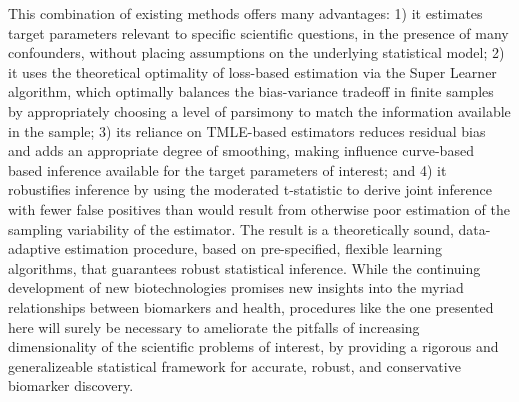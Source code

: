This combination of existing methods offers many advantages: 1) it estimates
target parameters relevant to specific scientific questions, in the presence of
many confounders, without placing assumptions on the underlying statistical
model; 2) it uses the theoretical optimality of loss-based estimation via the
Super Learner algorithm, which optimally balances the bias-variance tradeoff in
finite samples by appropriately choosing a level of parsimony to match the
information available in the sample; 3) its reliance on TMLE-based estimators
reduces residual bias and adds an appropriate degree of smoothing, making
influence curve-based based inference available for the target parameters of
interest; and 4) it robustifies inference by using the moderated t-statistic to
derive joint inference with fewer false positives than would result from
otherwise poor estimation of the sampling variability of the estimator. The
result is a theoretically sound, data-adaptive estimation procedure, based on
pre-specified, flexible learning algorithms, that guarantees robust statistical
inference. While the continuing development of new biotechnologies promises new
insights into the myriad relationships between biomarkers and health,
procedures like the one presented here will surely be necessary to ameliorate
the pitfalls of increasing dimensionality of the scientific problems of
interest, by providing a rigorous and generalizeable statistical framework for
accurate, robust, and conservative biomarker discovery.
